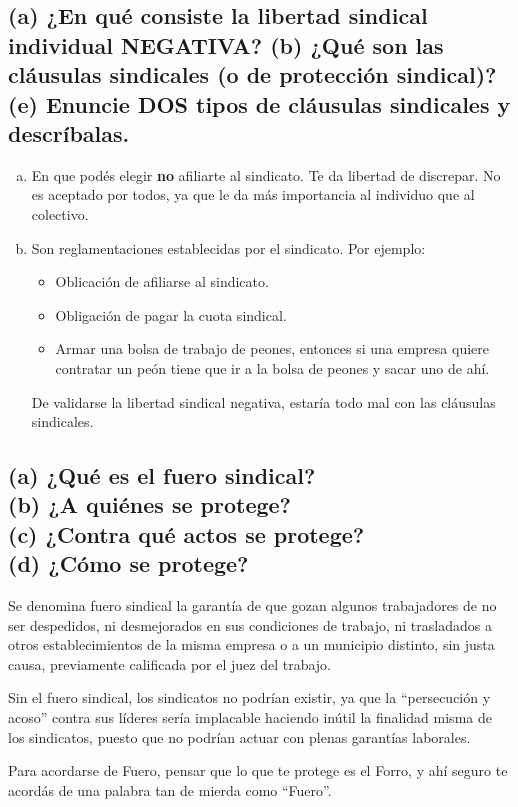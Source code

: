 \documentclass[spanish,12pt,a4paper,titlepage]{report}
\begin{document}
\subsection{(a) ¿En qué consiste la libertad sindical individual NEGATIVA? (b) ¿Qué son las cláusulas sindicales (o de protección sindical)? (e) Enuncie DOS tipos de cláusulas sindicales y descríbalas.}

\begin{enumerate}[(a)]
\item En que podés elegir \textbf{no} afiliarte al sindicato. Te da libertad de discrepar. No es aceptado por todos, ya que le da más importancia al individuo que al colectivo.
\item Son reglamentaciones establecidas por el sindicato. Por ejemplo:
  \begin{itemize}
  \item Oblicación de afiliarse al sindicato.
  \item Obligación de pagar la cuota sindical.
  \item Armar una bolsa de trabajo de peones, entonces si una empresa quiere contratar un peón tiene que ir a la bolsa de peones y sacar uno de ahí.
  \end{itemize}

De validarse la libertad sindical negativa, estaría todo mal con las cláusulas sindicales.
\end{enumerate}

\subsection{(a) ¿Qué es el fuero sindical?\\(b) ¿A quiénes se protege?\\(c) ¿Contra qué actos se protege?\\(d) ¿Cómo se protege?}

\label{sec:fuero-sindical}
Se denomina fuero sindical la garantía de que gozan algunos trabajadores de no ser despedidos, ni desmejorados en sus condiciones de trabajo, ni trasladados a otros establecimientos de la misma empresa o a un municipio distinto, sin justa causa, previamente calificada por el juez del trabajo.

Sin el fuero sindical, los sindicatos no podrían existir, ya que la “persecución y acoso” contra sus líderes sería implacable haciendo inútil la finalidad misma de los sindicatos, puesto que no podrían actuar con plenas garantías laborales.

Para acordarse de Fuero, pensar que lo que te protege es el Forro, y ahí seguro te acordás de una palabra tan de mierda como ``Fuero''.
\end{document}
